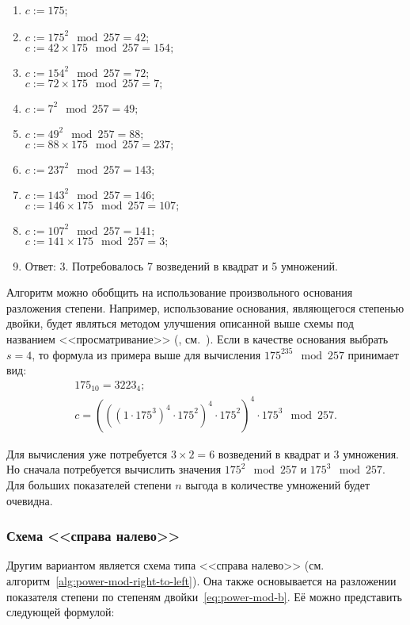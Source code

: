 \begin{enumerate}
	\item $c := 175$;
	\item $c := 175^2 \mod 257 = 42; $\\
		$c := 42 \times 175 \mod 257 = 154;$
	\item $c := 154^2 \mod 257 = 72; $\\
		$c := 72 \times 175 \mod 257 = 7;$
	\item $c := 7^2 \mod 257 = 49; $
	\item $c := 49^2 \mod 257 = 88; $\\
		$c := 88 \times 175 \mod 257 = 237;$
	\item $c := 237^2 \mod 257 = 143; $
	\item $c := 143^2 \mod 257 = 146; $\\
		$c := 146 \times 175 \mod 257 = 107;$
	\item $c := 107^2 \mod 257 = 141; $\\
		$c := 141 \times 175 \mod 257 = 3;$
	\item Ответ: 3. Потребовалось 7 возведений в квадрат и 5 умножений.
\end{enumerate}
\exampleend

Алгоритм можно обобщить на использование произвольного основания разложения степени. Например, использование основания, являющегося степенью двойки, будет являться методом улучшения описанной выше схемы под названием <<просматривание>> (, см.~\cite[9.3.2. Улучшение схем возведение в степень]{Crandall:Pomerance:2011}). Если в качестве основания выбрать $s = 4$, то формула из примера выше для вычисления $175^{235} \mod 257$ принимает вид:
\[\begin{array}{l}
	175_{10} = 3223_{4}; \\
	c = \left(\left(\left( 1 \cdot 175^3 \right)^4 \cdot 175^2 \right)^4 \cdot 175^2 \right)^4 \cdot 175^3 \mod 257.
\end{array}\]

Для вычисления уже потребуется $3 \times 2 = 6$ возведений в квадрат и $3$ умножения. Но сначала потребуется вычислить значения $175^2 \mod 257$ и $175^3 \mod 257$. Для больших показателей степени $n$ выгода в количестве умножений будет очевидна.

\subsubsection{Схема <<справа налево>>}
Другим вариантом является схема типа <<справа налево>> (см. алгоритм~\ref{alg:power-mod-right-to-left}). Она также основывается на разложении показателя степени по степеням двойки~\ref{eq:power-mod-b}. Её можно представить следующей формулой:

